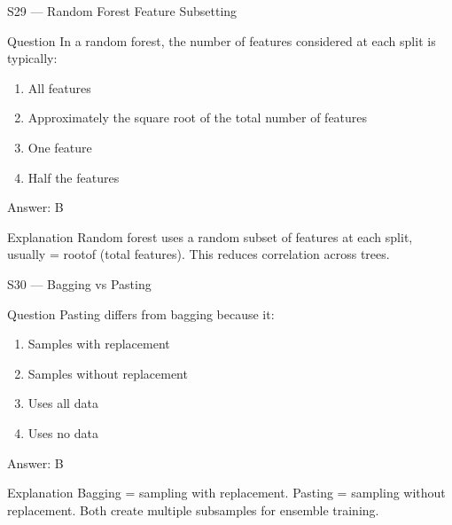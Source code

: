\documentclass[aspectratio=169,8pt]{beamer}
\begin{document}
	\begin{frame}{S29 --- Random Forest Feature Subsetting}
		\begin{block}{Question}
			In a random forest, the number of features considered at each split is typically:
			\begin{enumerate}
				\item All features
				\item Approximately the square root of the total number of features
				\item One feature
				\item Half the features
			\end{enumerate}
		\end{block}
		\begin{exampleblock}{Answer: B}\end{exampleblock}
		\begin{block}{Explanation}
			Random forest uses a random subset of features at each split, usually = rootof (total features). This reduces correlation across trees.
		\end{block}
	\end{frame}
	
	\begin{frame}{S30 --- Bagging vs Pasting}
		\begin{block}{Question}
			Pasting differs from bagging because it:
			\begin{enumerate}
				\item Samples with replacement
				\item Samples without replacement
				\item Uses all data
				\item Uses no data
			\end{enumerate}
		\end{block}
		\begin{exampleblock}{Answer: B}\end{exampleblock}
		\begin{block}{Explanation}
			Bagging = sampling with replacement. Pasting = sampling without replacement. Both create multiple subsamples for ensemble training.
		\end{block}
	\end{frame}
	
\end{document}
